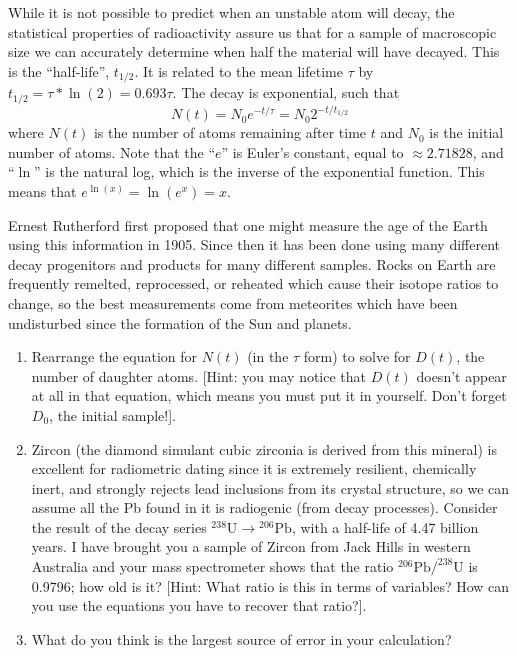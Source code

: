 \documentclass[12pt]{article}%
\begin{document}
While it is not possible to predict when an unstable atom will decay, the statistical properties of radioactivity assure us that for a sample of macroscopic size we can accurately determine when half the material will have decayed. 
This is the ``half-life'', $t_{1/2}$. It is related to the mean lifetime $\tau$ by 
$t_{1/2} = \tau * \ln(2) = 0.693 \tau.$
The decay is exponential, such that
$$N(t) = N_0 e^{-t/\tau} = N_0 2^{-t/t_{1/2}}$$
where $N(t)$ is the number of atoms remaining after time $t$ and $N_0$ is the initial number of atoms.
Note that the ``$e$'' is Euler's constant, equal to $\approx 2.71828$, and ``$\ln$'' is the natural log, which is the inverse of the exponential function. This means that $e^{\ln(x)} = \ln(e^{x}) = x$.

Ernest Rutherford first proposed that one might measure the age of the Earth using this information in 1905. 
Since then it has been done using many different decay progenitors and products for many different samples. 
Rocks on Earth are frequently remelted, reprocessed, or reheated which cause their isotope ratios to change, so the best measurements come from meteorites which have been undisturbed since the formation of the Sun and planets. 

\begin{enumerate}
    \item Rearrange the equation for $N(t)$ (in the $\tau$ form) to solve for $D(t)$, the number of daughter atoms. 
    [Hint: you may notice that $D(t)$ doesn't appear at all in that equation, which means you must put it in yourself. Don't forget $D_0$, the initial sample!].%
    \item Zircon (the diamond simulant cubic zirconia is derived from this mineral) is excellent for radiometric dating since it is extremely resilient, chemically inert, and strongly rejects lead inclusions from its crystal structure, so we can assume all the Pb found in it is radiogenic (from decay processes). 
    Consider the result of the decay series $\mathrm{^{238}U} \rightarrow \mathrm{^{206}Pb}$, with a half-life of 4.47 billion years. 
    I have brought you a sample of Zircon from Jack Hills in western Australia and your mass spectrometer shows that the ratio $\mathrm{ ^{206}Pb/^{238}U}$ is 0.9796; how old is it? [Hint: What ratio is this in terms of variables? How can you use the equations you have to recover that ratio?].
\item What do you think is the largest source of error in your calculation?
\end{enumerate}
\end{document}
